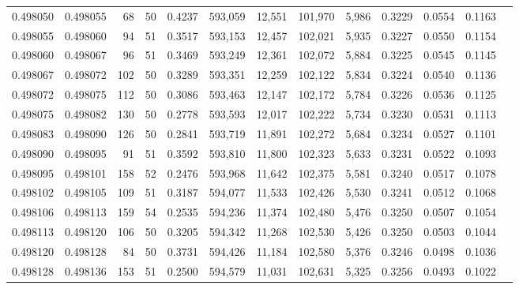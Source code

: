 \begin{tabular}{rrrrrrrrrrrrr}
0.498050 & 0.498055 &    68 &  50 &                                     0.4237 & 593,059 &  12,551 & 101,970 &   5,986 & 0.3229 & 0.0554 & 0.1163 \\
0.498055 & 0.498060 &    94 &  51 &                                     0.3517 & 593,153 &  12,457 & 102,021 &   5,935 & 0.3227 & 0.0550 & 0.1154 \\
0.498060 & 0.498067 &    96 &  51 &                                     0.3469 & 593,249 &  12,361 & 102,072 &   5,884 & 0.3225 & 0.0545 & 0.1145 \\
0.498067 & 0.498072 &   102 &  50 &                                     0.3289 & 593,351 &  12,259 & 102,122 &   5,834 & 0.3224 & 0.0540 & 0.1136 \\
0.498072 & 0.498075 &   112 &  50 &                                     0.3086 & 593,463 &  12,147 & 102,172 &   5,784 & 0.3226 & 0.0536 & 0.1125 \\
0.498075 & 0.498082 &   130 &  50 &                                     0.2778 & 593,593 &  12,017 & 102,222 &   5,734 & 0.3230 & 0.0531 & 0.1113 \\
0.498083 & 0.498090 &   126 &  50 &                                     0.2841 & 593,719 &  11,891 & 102,272 &   5,684 & 0.3234 & 0.0527 & 0.1101 \\
0.498090 & 0.498095 &    91 &  51 &                                     0.3592 & 593,810 &  11,800 & 102,323 &   5,633 & 0.3231 & 0.0522 & 0.1093 \\
0.498095 & 0.498101 &   158 &  52 &                                     0.2476 & 593,968 &  11,642 & 102,375 &   5,581 & 0.3240 & 0.0517 & 0.1078 \\
0.498102 & 0.498105 &   109 &  51 &                                     0.3187 & 594,077 &  11,533 & 102,426 &   5,530 & 0.3241 & 0.0512 & 0.1068 \\
0.498106 & 0.498113 &   159 &  54 &                                     0.2535 & 594,236 &  11,374 & 102,480 &   5,476 & 0.3250 & 0.0507 & 0.1054 \\
0.498113 & 0.498120 &   106 &  50 &                                     0.3205 & 594,342 &  11,268 & 102,530 &   5,426 & 0.3250 & 0.0503 & 0.1044 \\
0.498120 & 0.498128 &    84 &  50 &                                     0.3731 & 594,426 &  11,184 & 102,580 &   5,376 & 0.3246 & 0.0498 & 0.1036 \\
0.498128 & 0.498136 &   153 &  51 &                                     0.2500 & 594,579 &  11,031 & 102,631 &   5,325 & 0.3256 & 0.0493 & 0.1022 \\

\end{tabular}
